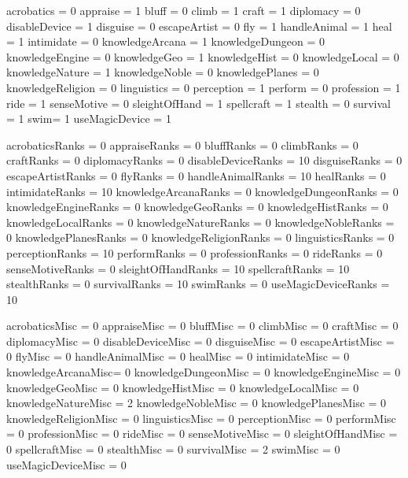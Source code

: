 \documentclass[10pt]{article}
\begin{document}

\begin{sagesilent}

	acrobatics = 0
	appraise = 1
	bluff = 0
	climb = 1
	craft = 1
	diplomacy = 0
	disableDevice = 1
	disguise = 0
	escapeArtist = 0
	fly = 1
	handleAnimal = 1
	heal = 1
	intimidate = 0
	knowledgeArcana = 1
	knowledgeDungeon = 0
	knowledgeEngine = 0
	knowledgeGeo = 1
	knowledgeHist = 0
	knowledgeLocal = 0
	knowledgeNature = 1
	knowledgeNoble = 0
	knowledgePlanes = 0
	knowledgeReligion = 0
	linguistics = 0
	perception = 1
	perform = 0
	profession = 1
	ride = 1
	senseMotive = 0
	sleightOfHand = 1
	spellcraft = 1
	stealth = 0
	survival = 1
	swim= 1
	useMagicDevice = 1

	acrobaticsRanks = 0
	appraiseRanks = 0
	bluffRanks = 0
	climbRanks = 0
	craftRanks = 0
	diplomacyRanks = 0
	disableDeviceRanks = 10
	disguiseRanks = 0
	escapeArtistRanks = 0
	flyRanks = 0
	handleAnimalRanks = 10
	healRanks = 0
	intimidateRanks = 10
	knowledgeArcanaRanks = 0
	knowledgeDungeonRanks = 0
	knowledgeEngineRanks = 0
	knowledgeGeoRanks = 0
	knowledgeHistRanks = 0
	knowledgeLocalRanks = 0
	knowledgeNatureRanks = 0
	knowledgeNobleRanks = 0
	knowledgePlanesRanks = 0
	knowledgeReligionRanks = 0
	linguisticsRanks = 0
	perceptionRanks = 10
	performRanks = 0
	professionRanks = 0
	rideRanks = 0
	senseMotiveRanks = 0
	sleightOfHandRanks = 10
	spellcraftRanks = 10
	stealthRanks = 0
	survivalRanks = 10
	swimRanks = 0
	useMagicDeviceRanks = 10
	
	acrobaticsMisc = 0
	appraiseMisc = 0
	bluffMisc = 0 
	climbMisc = 0 
	craftMisc = 0 
	diplomacyMisc = 0 
	disableDeviceMisc = 0
	disguiseMisc = 0 
	escapeArtistMisc = 0
	flyMisc = 0
	handleAnimalMisc = 0
	healMisc = 0
	intimidateMisc = 0
	knowledgeArcanaMisc= 0
	knowledgeDungeonMisc = 0
	knowledgeEngineMisc = 0
	knowledgeGeoMisc = 0
	knowledgeHistMisc = 0
	knowledgeLocalMisc = 0
	knowledgeNatureMisc = 2
	knowledgeNobleMisc = 0
	knowledgePlanesMisc = 0 
	knowledgeReligionMisc = 0
	linguisticsMisc = 0
	perceptionMisc = 0
	performMisc = 0
	professionMisc = 0
	rideMisc = 0
	senseMotiveMisc = 0 
	sleightOfHandMisc = 0
	spellcraftMisc = 0
	stealthMisc = 0
	survivalMisc = 2
	swimMisc = 0
	useMagicDeviceMisc = 0

\end{sagesilent}
\end{document}
